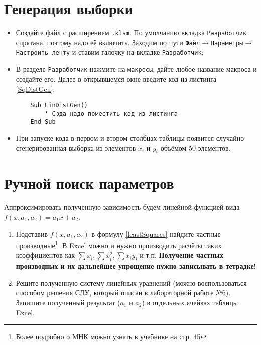 \documentclass[14pt,a4paper]{article}
\begin{document}
\section{Генерация выборки}
\noindent\begin{itemize}
	\item Создайте файл с расширением \texttt{.xlsm}. По умолчанию вкладка \texttt{Разработчик} спрятана, поэтому надо её включить. Заходим по пути \texttt{Файл$\rightarrow$Параметры$\rightarrow$Настроить ленту} и ставим галочку на вкладке \texttt{Разработчик};
	\item В разделе \texttt{Разработчик} нажмите на \texttt{макросы}, дайте любое название макроса и создайте его. Далее в открывшемся окне введите код из листинга \ref{SqDistGen};
	\begin{lstlisting} 
	Sub LinDistGen()
		' Сюда надо поместить код из листинга
	End Sub  
	\end{lstlisting}
	\item При запуске кода в первом и втором столбцах таблицы появится случайно сгенерированная выборка из элементов $x_i$ и $y_i$ объёмом 50 элементов.
\end{itemize}
\section{Ручной поиск параметров} \label{manualMethod}
Аппроксимировать полученную зависимость будем линейной функцией вида $f(x,a_1,a_2) = a_1x + a_2$.
\begin{enumerate}
    \item Подставив $f(x,a_1,a_2)$ в формулу \ref{leastSquares} найдите частные производные\footnote{Более подробно о МНК можно узнать в учебнике \cite{Stepanova2014} на стр. 45}. В Excel можно и нужно производить расчёты таких коэффициентов как $\sum x_i, \sum x_i^2, \sum x_iy_i$ и т.п. \textbf{Получение частных производных и их дальнейшее упрощение нужно записывать в тетрадке!}
    \item Решите полученную систему линейных уравнений (можно воспользоваться способом решения СЛУ, который описан в \href{https://github.com/PilipenkoKirill/MeasurementLabs/blob/main/lab6.pdf}{лабораторной работе №6}). Запишите полученный результат ($a_1$ и $a_2$) в отдельных ячейках таблицы Excel.
\end{enumerate}
\end{document}
